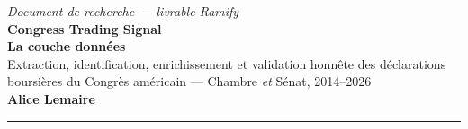 \documentclass[11pt,a4paper]{article}
\begin{document}
\begin{center}
{\small\itshape Document de recherche — livrable Ramify}\\[3pt]
{\Huge\bfseries Congress Trading Signal}\\[3pt]
{\Large\bfseries La couche données}\\[5pt]
{\normalsize Extraction, identification, enrichissement et validation honnête des déclarations\\
boursières du Congrès américain — Chambre \emph{et} Sénat, 2014--2026}\\[6pt]
{\large\bfseries Alice Lemaire}\quad\textperiodcentered\quad{\small\today}
\end{center}
\vspace{2pt}\hrule\vspace{6pt}

\end{document}
